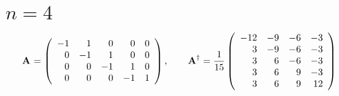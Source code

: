 \documentclass[10pt]{article}
\begin{document}
\section{$n=4$}
\begin{equation}
    \textbf{A}^{\mathrm{}}=
\left(
\begin{array}{rrrrr}
 -1 & 1 & 0 & 0 & 0 \\
 0 & -1 & 1 & 0 & 0 \\
 0 & 0 & -1 & 1 & 0 \\
 0 & 0 & 0 & -1 & 1
\end{array}
\right), \qquad
    \textbf{A}^{\mathrm{\dagger}}=\frac{1}{15}
\left(
\begin{array}{rrrr}
 -12 & -9 & -6 & -3 \\
 3 & -9 & -6 & -3 \\
 3 & 6 & -6 & -3 \\
 3 & 6 & 9 & -3 \\
 3 & 6 & 9 & 12
\end{array}
\right)
\end{equation}
\end{document}
